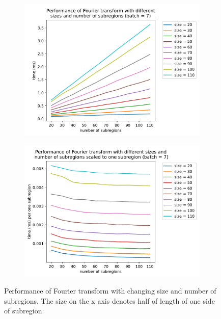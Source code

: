\begin{figure}
	\begin{subfigure}{.5\textwidth}
		\centering
		\includegraphics[width=\linewidth]{img/eval/fourier-transform-roi-count}
		\caption{}
		\label{fourier-transform-roi-count:basic}
	\end{subfigure}%
	\begin{subfigure}{.5\textwidth}
		\centering
		\includegraphics[width=\linewidth]{img/eval/fourier-transform-roi-count-scaled}
		\caption{}
		\label{fourier-transform-roi-count:scaled}
	\end{subfigure}
	\caption{Performance of Fourier transform with changing size and number of subregions. The size on the x axis denotes half of length of one side of subregion.}
	\label{fourier-transform-roi-count}
\end{figure}

